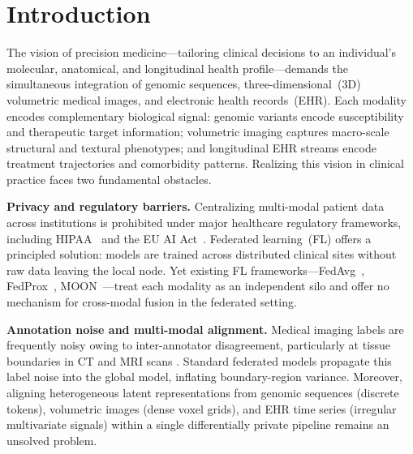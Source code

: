 \documentclass[a4paper,fleqn]{cas-dc}
\begin{document}
\maketitle

\section{Introduction}
\label{sec:intro}

The vision of precision medicine---tailoring clinical decisions to an
individual's molecular, anatomical, and longitudinal health profile---demands
the simultaneous integration of genomic sequences, three-dimensional~(3D)
volumetric medical images, and electronic health records~(EHR). Each modality
encodes complementary biological signal: genomic variants encode susceptibility
and therapeutic target information; volumetric imaging captures macro-scale
structural and textural phenotypes; and longitudinal EHR streams encode
treatment trajectories and comorbidity patterns. Realizing this vision in
clinical practice faces two fundamental obstacles.

\textbf{Privacy and regulatory barriers.} Centralizing multi-modal patient
data across institutions is prohibited under major healthcare regulatory
frameworks, including HIPAA~\citep{hipaa_guidance_2024} and the EU AI
Act~\citep{eu_ai_act_2024}. Federated learning~(FL) offers a principled
solution: models are trained across distributed clinical sites without raw data
leaving the local node. Yet existing FL frameworks---FedAvg~\citep{mcmahan2017},
FedProx~\citep{li2020fedprox}, MOON~\citep{li2021moon}---treat each modality
as an independent silo and offer no mechanism for cross-modal fusion in the
federated setting.

\textbf{Annotation noise and multi-modal alignment.} Medical imaging labels are
frequently noisy owing to inter-annotator disagreement, particularly at tissue
boundaries in CT and MRI scans \citep{rue_ct_2025}. Standard federated models
propagate this label noise into the global model, inflating boundary-region
variance. Moreover, aligning heterogeneous latent representations from
genomic sequences (discrete tokens), volumetric images (dense voxel grids), and
EHR time series (irregular multivariate signals) within a single differentially
private pipeline remains an unsolved problem.
\end{document}
